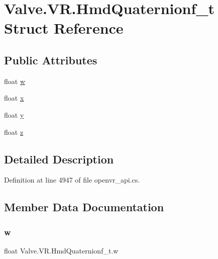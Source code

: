 \hypertarget{struct_valve_1_1_v_r_1_1_hmd_quaternionf__t}{}\section{Valve.\+V\+R.\+Hmd\+Quaternionf\+\_\+t Struct Reference}
\label{struct_valve_1_1_v_r_1_1_hmd_quaternionf__t}
\subsection*{Public Attributes}
\begin{DoxyCompactItemize}
\item 
float \mbox{\hyperlink{struct_valve_1_1_v_r_1_1_hmd_quaternionf__t_ada121a79a826262bd3dec57ec79b5aa2}{w}}
\item 
float \mbox{\hyperlink{struct_valve_1_1_v_r_1_1_hmd_quaternionf__t_adfd11b6c1f41fa63e5f8b54f34287d65}{x}}
\item 
float \mbox{\hyperlink{struct_valve_1_1_v_r_1_1_hmd_quaternionf__t_a64e4ca31abf28fb7cc30dcba37e2c7d9}{y}}
\item 
float \mbox{\hyperlink{struct_valve_1_1_v_r_1_1_hmd_quaternionf__t_ae3071f122985db1cb2d8cf67bc38763a}{z}}
\end{DoxyCompactItemize}


\subsection{Detailed Description}


Definition at line 4947 of file openvr\+\_\+api.\+cs.



\subsection{Member Data Documentation}
\mbox{\label{struct_valve_1_1_v_r_1_1_hmd_quaternionf__t_ada121a79a826262bd3dec57ec79b5aa2}} 
\subsubsection{\texorpdfstring{w}{w}}
{\footnotesize\ttfamily float Valve.\+V\+R.\+Hmd\+Quaternionf\+\_\+t.\+w}



